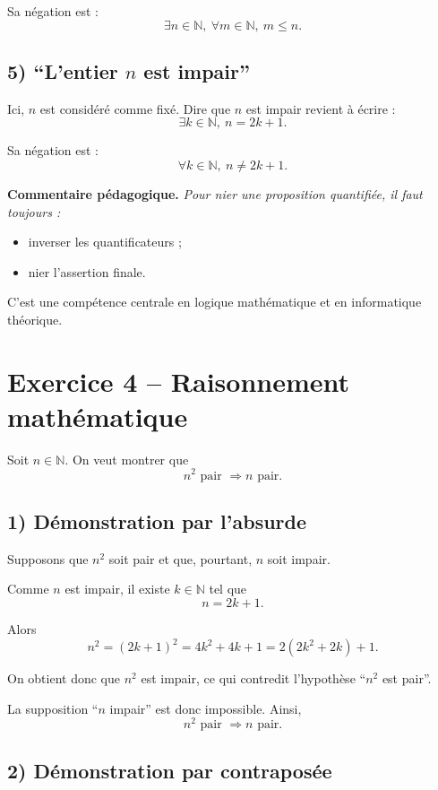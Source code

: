 \documentclass[12pt,a4paper]{article}
\newenvironment{pedago}
{\par\smallskip\noindent\textbf{Commentaire pédagogique. }\itshape}
{\par\smallskip}
\begin{document}
Sa négation est :
\[
\exists n\in\mathbb N,\ \forall m\in\mathbb N,\ m\le n.
\]

\subsection*{5) ``L'entier $n$ est impair''}

Ici, $n$ est considéré comme fixé. Dire que $n$ est impair revient à écrire :
\[
\exists k\in\mathbb N,\ n=2k+1.
\]

Sa négation est :
\[
\forall k\in\mathbb N,\ n\neq 2k+1.
\]

\begin{pedago}
Pour nier une proposition quantifiée, il faut toujours :
\begin{itemize}[leftmargin=1.2cm]
    \item inverser les quantificateurs ;
    \item nier l'assertion finale.
\end{itemize}
C'est une compétence centrale en logique mathématique et en informatique théorique.
\end{pedago}

\bigskip

\section*{Exercice 4 -- Raisonnement mathématique}

Soit $n\in\mathbb N$. On veut montrer que
\[
n^2 \text{ pair } \Longrightarrow n \text{ pair}.
\]

\subsection*{1) Démonstration par l'absurde}

Supposons que $n^2$ soit pair et que, pourtant, $n$ soit impair.

Comme $n$ est impair, il existe $k\in\mathbb N$ tel que
\[
n=2k+1.
\]

Alors
\[
n^2=(2k+1)^2=4k^2+4k+1=2(2k^2+2k)+1.
\]

On obtient donc que $n^2$ est impair, ce qui contredit l'hypothèse ``$n^2$ est pair''.

La supposition ``$n$ impair'' est donc impossible. Ainsi,
\[
\boxed{n^2\text{ pair } \Longrightarrow n\text{ pair}.}
\]

\subsection*{2) Démonstration par contraposée}
\end{document}
